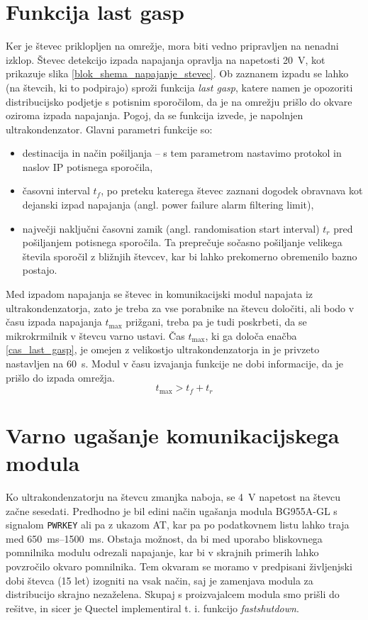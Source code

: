 \documentclass[a4paper,twoside,openright,12pt,slovene]{book}
\begin{document}
\section{Funkcija last gasp}
Ker je števec priklopljen na omrežje, mora biti vedno pripravljen na nenadni izklop. Števec detekcijo izpada napajanja opravlja na napetosti \SI{20}{\volt}, kot prikazuje slika \ref{blok_shema_napajanje_stevec}. Ob zaznanem izpadu se lahko (na števcih, ki to podpirajo) sproži funkcija \textit{last gasp}, katere namen je opozoriti distribucijsko podjetje s potisnim sporočilom, da je na omrežju prišlo do okvare oziroma izpada napajanja. Pogoj, da se funkcija izvede, je napolnjen ultrakondenzator. Glavni parametri funkcije so:
\begin{itemize}
    \item destinacija in način pošiljanja -- s tem parametrom nastavimo protokol in naslov IP potisnega sporočila,
    \item časovni interval ${t_f}$, po preteku katerega števec zaznani dogodek obravnava kot dejanski izpad napajanja (angl. power failure alarm filtering limit),
    \item največji naključni časovni zamik (angl. randomisation start interval) ${t_r}$ pred pošiljanjem potisnega sporočila. Ta preprečuje sočasno pošiljanje velikega števila sporočil z bližnjih števcev, kar bi lahko prekomerno obremenilo bazno postajo.
\end{itemize}

Med izpadom napajanja se števec in komunikacijski modul napajata iz ultrakondenzatorja, zato je treba za vse porabnike na števcu določiti, ali bodo v času izpada napajanja $t_{\mathrm{max}}$ prižgani, treba pa je tudi poskrbeti, da se mikrokrmilnik v števcu varno ustavi. 
Čas $t_{\mathrm{max}}$, ki ga določa enačba \ref{cas_last_gasp}, je omejen z velikostjo ultrakondenzatorja in je privzeto nastavljen na \SI{60}{\second}. Modul v času izvajanja funkcije ne dobi informacije, da je prišlo do izpada omrežja.
\begin{equation}
    t_{\mathrm{max}} > t_f + t_r 
    \label{cas_last_gasp} 
\end{equation}
    

\section{Varno ugašanje komunikacijskega modula}
Ko ultrakondenzatorju na števcu zmanjka naboja, se \SI{4}{\volt} napetost na števcu začne sesedati. Predhodno je bil edini način ugašanja modula BG955A-GL s signalom \texttt{PWRKEY} ali pa z ukazom AT, kar pa po podatkovnem listu lahko traja med \SIrange{650}{1500}{\milli\second}. Obstaja možnost, da bi med uporabo bliskovnega pomnilnika modulu odrezali napajanje, kar bi v skrajnih primerih lahko povzročilo okvaro pomnilnika. Tem okvaram se moramo v predpisani življenjski dobi števca (15 let) izogniti na vsak način, saj je zamenjava modula za distribucijo skrajno nezaželena. Skupaj s proizvajalcem modula smo prišli do rešitve, in sicer je Quectel implementiral t. i. funkcijo \textit{fastshutdown}.
\end{document}
